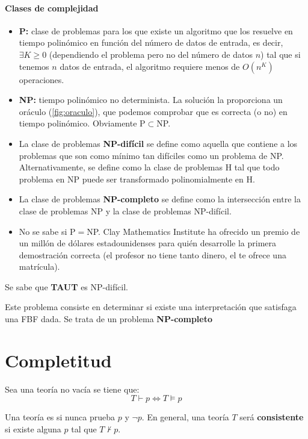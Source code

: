 \documentclass{apuntes}
\begin{document}
\paragraph{Clases de complejidad}
\begin{itemize}
	\item \textbf{P:} clase de problemas para los que existe un algoritmo que los resuelve en tiempo polinómico en función del número de datos de entrada, es decir, $\exists K\ge 0$ (dependiendo el problema pero no del número de datos $n$) tal que si tenemos $n$ datos de entrada, el algoritmo requiere menos de $O(n^K)$ operaciones.
	\item \textbf{NP:} tiempo polinómico no determinista. La solución la proporciona un oráculo (\ref{fig:oraculo}), que podemos comprobar que es correcta (o no) en tiempo polinómico. Obviamente P$\subset$NP.
		\item La clase de problemas \textbf{NP-difícil} se define como aquella que contiene a los problemas que son como mínimo tan difíciles como un problema de NP. Alternativamente, se define como la clase de problemas H tal que todo problema en NP puede ser transformado polinomialmente en H.
	\item La clase de problemas \textbf{NP-completo} se define como la intersección entre la clase de problemas NP y la clase de problemas NP-difícil.
	\item No se sabe si P$=$NP. Clay Mathematics Institute ha ofrecido un premio de un millón de dólares estadounidenses para quién desarrolle la primera demostración correcta (el profesor no tiene tanto dinero, el te ofrece una matrícula).
\end{itemize}
Se sabe que \textbf{TAUT} es NP-difícil.

\begin{defn}
Este problema consiste en determinar si existe una interpretación que satisfaga una FBF dada. Se trata de un problema \textbf{NP-completo}
\end{defn}

\section{Completitud}
\begin{theorem}
Sea una teoría no vacía se tiene que:
\[T \vdash p \iff T \vDash p\]
\end{theorem}

Una teoría es  si nunca prueba $p$ y $\neg p$. En general, una teoría $T$ será \textbf{consistente} si existe alguna $p$ tal que $T \nvdash p$. 
\end{document}
